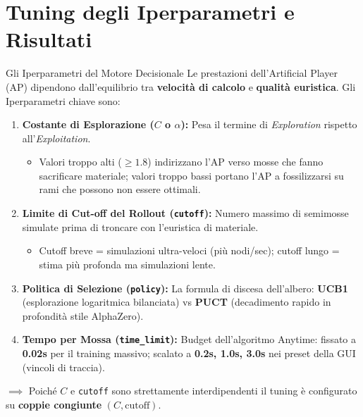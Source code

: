 \documentclass[10pt]{beamer}
\begin{document}
\section{Tuning degli Iperparametri e Risultati}
\begin{frame}{Gli Iperparametri del Motore Decisionale}
    Le prestazioni dell'Artificial Player (AP) dipendono dall'equilibrio tra \textbf{velocità di calcolo} e \textbf{qualità euristica}. Gli Iperparametri chiave sono: 
    
    \vspace{0.2cm}
    \begin{enumerate}
        \item \textbf{Costante di Esplorazione ($C$ o $\alpha$):}
        Pesa il termine di \textit{Exploration} rispetto all'\textit{Exploitation}. 
        \begin{itemize}
            \item Valori troppo alti ($\ge 1.8$) indirizzano l'AP verso mosse che fanno sacrificare materiale; valori troppo bassi portano l'AP a fossilizzarsi su rami che possono non essere ottimali.
        \end{itemize}

        \item \textbf{Limite di Cut-off del Rollout (\texttt{cutoff}):}
        Numero massimo di semimosse simulate prima di troncare con l'euristica di materiale.
        \begin{itemize}
            \item Cutoff breve = simulazioni ultra-veloci (più nodi/sec); cutoff lungo = stima più profonda ma simulazioni lente.
        \end{itemize}

        \item \textbf{Politica di Selezione (\texttt{policy}):}
        La formula di discesa dell'albero: \textbf{UCB1} (esplorazione logaritmica bilanciata) vs \textbf{PUCT} (decadimento rapido in profondità stile AlphaZero).

        \item \textbf{Tempo per Mossa (\texttt{time\_limit}):}
        Budget dell'algoritmo Anytime: fissato a \textbf{0.02s} per il training massivo; scalato a \textbf{0.2s, 1.0s, 3.0s} nei preset della GUI (vincoli di traccia).
    \end{enumerate}

    \vspace{0.15cm}
    \footnotesize
    $\implies$ Poiché $C$ e \texttt{cutoff} sono strettamente interdipendenti il tuning è configurato su \textbf{coppie congiunte} $(C,      
\text{cutoff})$.
\end{frame}
\end{document}
